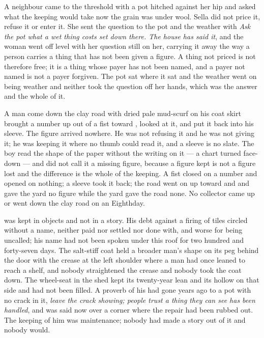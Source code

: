 \scenebreak

A neighbour came to the threshold with a pot hitched against her hip and asked what the keeping would take now the grain was under wool. Sella did not price it, refuse it or enter it. She sent the question to the pot and the weather with \emph{Ask the pot what a wet thing costs set down there. The house has said it}, and the woman went off level with her question still on her, carrying it away the way a person carries a thing that has not been given a figure. A thing not priced is not therefore free; it is a thing whose payer has not been named, and a payer not named is not a payer forgiven. The pot sat where it sat and the weather went on being weather and neither took the question off her hands, which was the answer and the whole of it.

A man come down the clay road with dried pale mud-scurf on his coat skirt brought a number up out of a fist toward , looked at it, and put it back into his sleeve. The figure arrived nowhere. He was not refusing it and he was not giving it; he was keeping it where no thumb could read it, and a sleeve is no slate. The boy read the shape of the paper without the writing on it --- a chart turned face-down --- and did not call it a missing figure, because a figure kept is not a figure lost and the difference is the whole of the keeping. A fist closed on a number and opened on nothing; a sleeve took it back; the road went on up toward  and  and gave the yard no figure while the yard gave the road none. No collector came up or went down the clay road on an Eighthday.

 was kept in objects and not in a story. His debt against a firing of tiles circled without a name, neither paid nor settled nor done with, and worse for being uncalled; his name had not been spoken under this roof for two hundred and forty-seven days. The salt-stiff coat held a broader man's shape on its peg behind the door with the crease at the left shoulder where a man had once leaned to reach a shelf, and nobody straightened the crease and nobody took the coat down. The wheel-seat in the shed kept its twenty-year lean and its hollow on that side and had not been filled. A proverb of his had gone years ago to a pot with no crack in it, \emph{leave the crack showing; people trust a thing they can see has been handled}, and was said now over a corner where the repair had been rubbed out. The keeping of him was maintenance; nobody had made a story out of it and nobody would.

